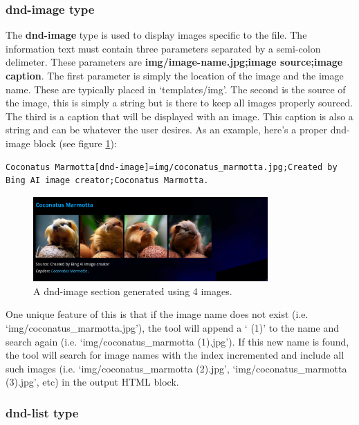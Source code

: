 \subsubsection{dnd-image type}

The \textbf{dnd-image} type is used to display images specific to the file. The information text must contain three parameters separated by a semi-colon delimeter. These parameters are \textbf{img/image-name.jpg;image source;image caption}. The first parameter is simply the location of the image and the image name. These are typically placed in `templates/img'. The second is the source of the image, this is simply a string but is there to keep all images properly sourced. The third is a caption that will be displayed with an image. This caption is also a string and can be whatever the user desires. As an example, here's a proper dnd-image block (see figure \ref{fig:dnd-image-fig}):

\begin{lstlisting}
Coconatus Marmotta[dnd-image]=img/coconatus_marmotta.jpg;Created by Bing AI image creator;Coconatus Marmotta.
\end{lstlisting}

\begin{figure}[h]
	\centering
	\includegraphics[width=0.8\textwidth]{images/dnd-image-section.png}
	\caption{A dnd-image section generated using 4 images.}
	\label{fig:dnd-image-fig}
\end{figure}

One unique feature of this is that if the image name does not exist (i.e. `img/coconatus\_marmotta.jpg'), the tool will append a ` (1)' to the name and search again (i.e. `img/coconatus\_marmotta (1).jpg'). If this new name is found, the tool will search for image names with the index incremented and include all such images (i.e. `img/coconatus\_marmotta (2).jpg', `img/coconatus\_marmotta (3).jpg', etc) in the output HTML block.  

\subsubsection{dnd-list type}

